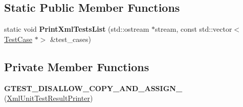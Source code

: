 \subsection*{Static Public Member Functions}
\begin{DoxyCompactItemize}
\item 
\mbox{\label{classtesting_1_1internal_1_1_xml_unit_test_result_printer_ad202babf81b4b6d6d2f98df1e27a2d50}} 
static void {\bfseries Print\+Xml\+Tests\+List} (std\+::ostream $\ast$stream, const std\+::vector$<$ \mbox{\hyperlink{classtesting_1_1_test_case}{Test\+Case}} $\ast$$>$ \&test\+\_\+cases)
\end{DoxyCompactItemize}
\subsection*{Private Member Functions}
\begin{DoxyCompactItemize}
\item 
\mbox{\label{classtesting_1_1internal_1_1_xml_unit_test_result_printer_a2384a8c0cae7cbdf3debac145e43b323}} 
{\bfseries G\+T\+E\+S\+T\+\_\+\+D\+I\+S\+A\+L\+L\+O\+W\+\_\+\+C\+O\+P\+Y\+\_\+\+A\+N\+D\+\_\+\+A\+S\+S\+I\+G\+N\+\_\+} (\mbox{\hyperlink{classtesting_1_1internal_1_1_xml_unit_test_result_printer}{Xml\+Unit\+Test\+Result\+Printer}})
\end{DoxyCompactItemize}

